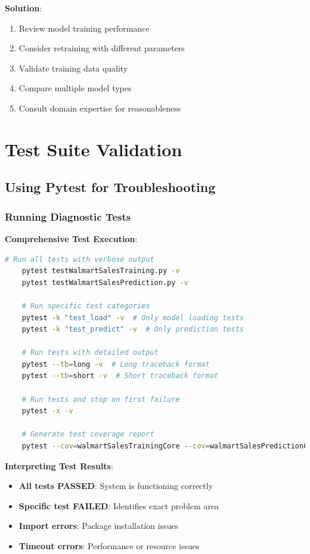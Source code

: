 \textbf{Solution}:
\begin{enumerate}
	\item Review model training performance
	\item Consider retraining with different parameters
	\item Validate training data quality
	\item Compare multiple model types
	\item Consult domain expertise for reasonableness
\end{enumerate}

\section{Test Suite Validation}

\subsection{Using Pytest for Troubleshooting}

\subsubsection{Running Diagnostic Tests}

\textbf{Comprehensive Test Execution}:
\begin{lstlisting}[language=bash,basicstyle=\color{blue}]
	# Run all tests with verbose output
	pytest testWalmartSalesTraining.py -v
	pytest testWalmartSalesPrediction.py -v
	
	# Run specific test categories
	pytest -k "test_load" -v  # Only model loading tests
	pytest -k "test_predict" -v  # Only prediction tests
	
	# Run tests with detailed output
	pytest --tb=long -v  # Long traceback format
	pytest --tb=short -v  # Short traceback format
	
	# Run tests and stop on first failure
	pytest -x -v
	
	# Generate test coverage report
	pytest --cov=walmartSalesTrainingCore --cov=walmartSalesPredictionCore
\end{lstlisting}

\textbf{Interpreting Test Results}:
\begin{itemize}
	\item \textbf{All tests PASSED}: System is functioning correctly
	\item \textbf{Specific test FAILED}: Identifies exact problem area
	\item \textbf{Import errors}: Package installation issues
	\item \textbf{Timeout errors}: Performance or resource issues
\end{itemize}

